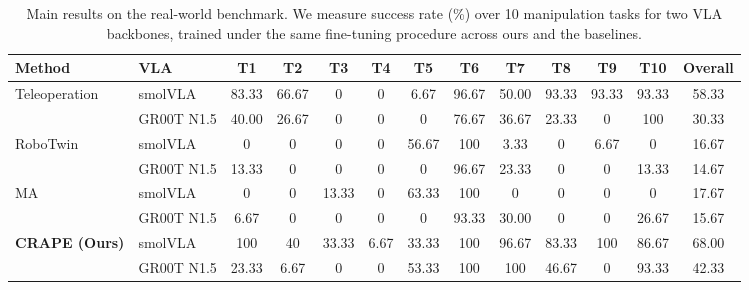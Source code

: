 \documentclass{article}
\begin{document}
\begin{table}[t]
\centering
\caption{Main results on the real-world benchmark. We measure success rate (\%) over 10 manipulation tasks for two VLA backbones, trained under the same fine-tuning procedure across ours and the baselines.}
\label{tab:main}
\begin{adjustbox}{width=0.98\textwidth}
\small
\setlength{\tabcolsep}{3pt}
\begin{tabular}{l|l | cccccccccc | c}
\toprule
\textbf{Method} & \textbf{VLA}
& \textbf{T1} & \textbf{T2} & \textbf{T3} & \textbf{T4} & \textbf{T5}
& \textbf{T6} & \textbf{T7} & \textbf{T8} & \textbf{T9} & \textbf{T10}
& \textbf{Overall} \\
\midrule
\multirow{2}{*}{Teleoperation}
  & smolVLA     & 83.33 & 66.67 & 0 & 0 & 6.67 & 96.67 & 50.00 & 93.33 & 93.33 & 93.33 & 58.33 \\
  & GR00T N1.5  & 40.00 & 26.67 & 0 & 0 & 0 & 76.67 & 36.67 & 23.33 & 0 & 100 & 30.33 \\
\midrule
\multirow{2}{*}{RoboTwin}
  & smolVLA     & 0 & 0 & 0 & 0 & 56.67 & 100 & 3.33 & 0 & 6.67 & 0 & 16.67 \\
  & GR00T N1.5  & 13.33 & 0 & 0 & 0 & 0 & 96.67 & 23.33 & 0 & 0 & 13.33 & 14.67 \\
\midrule
\multirow{2}{*}{MA}
  & smolVLA     & 0 & 0 & 13.33 & 0 & 63.33 & 100 & 0 & 0 & 0 & 0 & 17.67 \\
  & GR00T N1.5  & 6.67 & 0 & 0 & 0 & 0 & 93.33 & 30.00 & 0 & 0 & 26.67 & 15.67 \\
\midrule
\multirow{2}{*}{\textbf{CRAPE (Ours)}}
  & smolVLA     & 100 & 40 & 33.33 & 6.67 & 33.33 & 100 & 96.67 & 83.33 & 100 & 86.67 & 68.00 \\
  & GR00T N1.5  & 23.33 & 6.67 & 0 & 0 & 53.33 & 100 & 100 & 46.67 & 0 & 93.33 & 42.33 \\
\bottomrule
\end{tabular}
\end{adjustbox}
\end{table}

\end{document}
